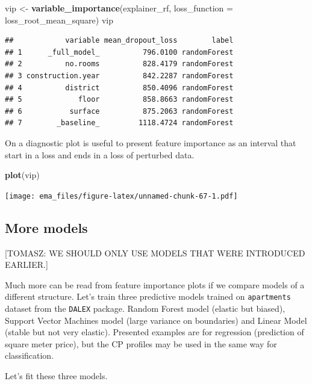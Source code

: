 \documentclass[12pt,]{krantz}
\newenvironment{Shaded}{\begin{snugshade}}{\end{snugshade}}
\newcommand{\DataTypeTok}[1]{\textcolor[rgb]{0.13,0.29,0.53}{#1}}
\newcommand{\KeywordTok}[1]{\textcolor[rgb]{0.13,0.29,0.53}{\textbf{#1}}}
\newcommand{\NormalTok}[1]{#1}
\newcommand{\StringTok}[1]{\textcolor[rgb]{0.31,0.60,0.02}{#1}}
\begin{document}
\begin{Shaded}
\begin{Highlighting}[]
\NormalTok{vip <-}\StringTok{ }\KeywordTok{variable_importance}\NormalTok{(explainer_rf, }
            \DataTypeTok{loss_function =}\NormalTok{ loss_root_mean_square)}
\NormalTok{vip}
\end{Highlighting}
\end{Shaded}

\begin{verbatim}
##            variable mean_dropout_loss        label
## 1      _full_model_          796.0100 randomForest
## 2          no.rooms          828.4179 randomForest
## 3 construction.year          842.2287 randomForest
## 4          district          850.4096 randomForest
## 5             floor          858.8663 randomForest
## 6           surface          875.2063 randomForest
## 7        _baseline_         1118.4724 randomForest
\end{verbatim}

On a diagnostic plot is useful to present feature importance as an interval that start in a loss and ends in a loss of perturbed data.

\begin{Shaded}
\begin{Highlighting}[]
\KeywordTok{plot}\NormalTok{(vip)}
\end{Highlighting}
\end{Shaded}

\texttt{[image: ema\_files/figure-latex/unnamed-chunk-67-1.pdf]}

\hypertarget{more-models}{%
\subsection{More models}\label{more-models}}

{[}TOMASZ: WE SHOULD ONLY USE MODELS THAT WERE INTRODUCED EARLIER.{]}

Much more can be read from feature importance plots if we compare models of a different structure.
Let's train three predictive models trained on \texttt{apartments} dataset from the \texttt{DALEX} package. Random Forest model \citep{R-randomForest} (elastic but biased), Support Vector Machines model \citep{R-e1071} (large variance on boundaries) and Linear Model (stable but not very elastic).
Presented examples are for regression (prediction of square meter price), but the CP profiles may be used in the same way for classification.

Let's fit these three models.
\end{document}
